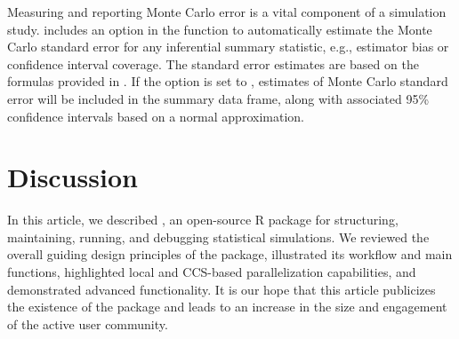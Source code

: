 Measuring and reporting Monte Carlo error is a vital component of a simulation study.  includes an option in the  function to automatically estimate the Monte Carlo standard error for any inferential summary statistic, e.g., estimator bias or confidence interval coverage. The standard error estimates are based on the formulas provided in \citet{morris2019}. If the option  is set to , estimates of Monte Carlo standard error will be included in the summary data frame, along with associated 95\% confidence intervals based on a normal approximation.


\section{Discussion}\label{sec:discussion}

In this article, we described , an open-source R package for structuring, maintaining, running, and debugging statistical simulations. We reviewed the overall guiding design principles of the package, illustrated its workflow and main functions, highlighted local and CCS-based parallelization capabilities, and demonstrated advanced functionality. It is our hope that this article publicizes the existence of the package and leads to an increase in the size and engagement of the active user community.


